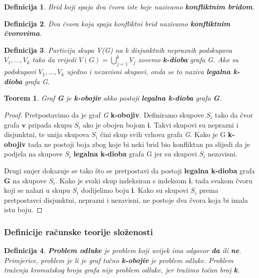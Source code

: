 \documentclass[times, utf8, diplomski, numeric]{fer}
\newtheorem{definition}{Definicija}
\newtheorem{theorem}{Teorem}
\begin{document}
\begin{definition}
Brid koji spaja dva čvora iste boje nazivamo \textbf{konfliktnim bridom}.
\end{definition}

\begin{definition}
Dva čvora koja spaja konfliktni brid nazivamo \textbf{konfliktnim čvorovima}.
\end{definition}

\begin{definition}
Particiju skupa V(G) na k disjunktnih nepraznih podskupova $V_1,..., V_k$
 tako da vrijedi $V(G) = \bigcup_{j=1}^{k}V_j$ zovemo \textbf{k-dioba} grafa G. Ako su podskupovi  $V_1 ,..., V_k$  ujedno i nezavisni skupovi, onda se to naziva \textbf{legalna k-dioba} grafa G.
\end{definition}

\begin{theorem}
\label{thm:dioba}
Graf \textbf{G} je \textbf{k-obojiv} akko postoji \textbf{legalna k-dioba} grafa \textbf{G}.
\end{theorem}

\begin{proof}
Pretpostavimo da je graf \emph{G} \textbf{k-obojiv}. Definiramo skupove $S_i$ tako da čvor grafa $\mathbf{v}$ pripada skupu $S_i$ ako je obojen bojom $\mathbf{i}$. Takvi skupovi su neprazni i disjunktni, te unija skupova $S_i$ čini skup svih vrhova grafa \emph{G}. Kako je G \textbf{k-obojiv} tada ne postoji boja zbog koje bi neki brid bio konfliktan pa slijedi da je podjela na skupove $S_i$ \textbf{legalna k-dioba} grafa G jer su skupovi $S_i$ nezavisni. 

Drugi smjer dokazuje se tako što se pretpostavi da postoji \textbf{legalna k-dioba} grafa \textbf{G} na skupove $S_i$. Kako je svaki skup indeksiran s indeksom \textbf{i}, tada svakom čvoru koji se nalazi u skupu $S_i$ dodijelimo boju \textbf{i}. Kako su skupovi $S_i$ prema pretpostavci disjunktni, neprazni i nezavisni, ne postoje dva čvora koja bi imala istu boju.
\end{proof}

\subsubsection{Definicije računske teorije složenosti}

\begin{definition}
\textbf{Problem odluke} je problem koji uvijek ima odgovor \textbf{da} ili \textbf{ne}. Primjerice, problem je li je graf točno \textbf{k-obojiv} je problem odluke. Problem traženja kromatskog broja grafa nije problem odluke, jer tražimo točan broj \textbf{k}.
\end{definition}
\end{document}
